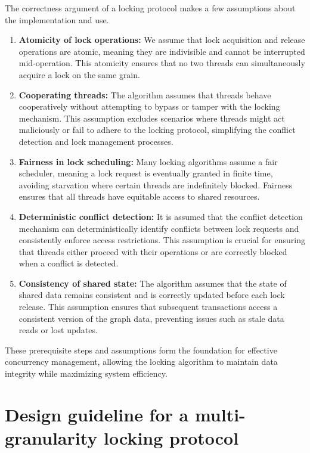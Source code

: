 The correctness argument of a locking protocol makes a few assumptions about the implementation and use.

\begin{enumerate}
    \item \textbf{Atomicity of lock operations:} We assume that lock acquisition and release operations are atomic, meaning they are indivisible and cannot be interrupted mid-operation. This atomicity ensures that no two threads can simultaneously acquire a lock on the same grain.

    \item \textbf{Cooperating threads:} The algorithm assumes that threads behave cooperatively without attempting to bypass or tamper with the locking mechanism. This assumption excludes scenarios where threads might act maliciously or fail to adhere to the locking protocol, simplifying the conflict detection and lock management processes.
    
    \item  \textbf{Fairness in lock scheduling:} Many locking algorithms assume a fair scheduler, meaning a lock request is eventually granted in finite time, avoiding starvation where certain threads are indefinitely blocked. Fairness ensures that all threads have equitable access to shared resources.

    \item \textbf{Deterministic conflict detection:}  It is assumed that the conflict detection mechanism can deterministically identify conflicts between lock requests and consistently enforce access restrictions. This assumption is crucial for ensuring that threads either proceed with their operations or are correctly blocked when a conflict is detected.
    
    \item \textbf{Consistency of shared state:} The algorithm assumes that the state of shared data remains consistent and is correctly updated before each lock release. This assumption ensures that subsequent transactions access a consistent version of the graph data, preventing issues such as stale data reads or lost updates.
\end{enumerate}


These prerequisite steps and assumptions form the foundation for effective concurrency management, allowing the locking algorithm to maintain data integrity while maximizing system efficiency.



\section{Design guideline for a multi-granularity locking protocol} \label{sec:requirements}

